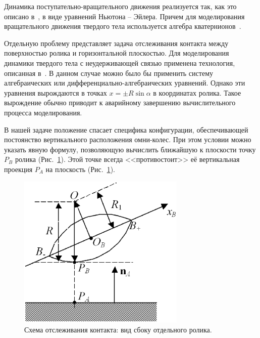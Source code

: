 Динамика поступательно-вращательного движения реализуется так, как это описано
в~\cite{Kosenko2007}, в виде уравнений Ньютона -- Эйлера. Причем для 
моделирования вращательного движения твердого тела используется алгебра 
кватернионов~\cite{KosenkoQuaternionRus,Kosenko1998}.

Отдельную проблему представляет задача отслеживания контакта между поверхностью 
ролика и горизонтальной плоскостью. Для моделирования динамики твердого тела с
неудерживающей связью применена технология, описанная в~\cite{Kosenko2006}. В
данном случае можно было бы применить систему алгебраических или 
дифференциально-алгебраических уравнений. Однако эти уравнения вырождаются в 
точках $x=\pm R\sin\alpha $ в координатах ролика. Такое вырождение обычно 
приводит к аварийному завершению вычислительного процесса моделирования.

В нашей задаче положение спасает специфика конфигурации, обеспечивающей 
постоянство вертикального расположения омни-колес. При этом условии можно
указать явную формулу, позволяющую вычислить ближайшую к плоскости точку $P_B$
ролика (Рис.~\ref{ContactScheme}). Этой точке всегда <<противостоит>> её 
вертикальная проекция $P_A$ на плоскость (Рис.~\ref{ContactScheme}).

\begin{figure}[htb]
\centering\includegraphics[width=8cm]{content/parts/3_friction/nd/RollerSection.eps}
\caption{Схема отслеживания контакта: вид сбоку отдельного ролика.}
\label{ContactScheme}
\end{figure}

